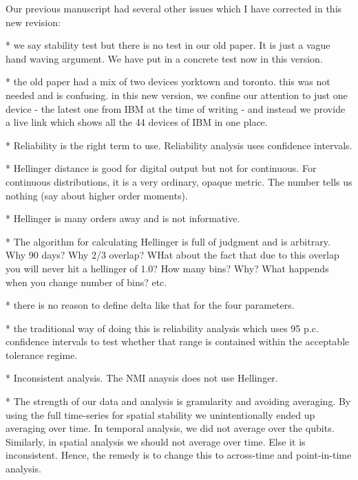 \documentclass[conference]{IEEEtran}
\begin{document}
Our previous manuscript had several other issues which I have corrected in this new revision:

* we say stability test but there is no test in our old paper. It is just a vague hand waving argument. We have put in a concrete test now in this version.

* the old paper had a mix of two devices yorktown and toronto. this was not needed and is confusing. in this new version, we confine our attention to just one device - the latest one from IBM at the time of writing - and instead we provide a live link which shows all the 44 devices of IBM in one place.

* Reliability is the right term to use. Reliability analysis uses confidence intervals.

* Hellinger distance is good for digital output but not for continuous. For continuous distributions, it is a very ordinary, opaque metric. The number tells us nothing (say about higher order moments).

* Hellinger is many orders away and is not informative.

* The algorithm for calculating Hellinger is full of judgment and is arbitrary. Why 90 days? Why 2/3 overlap? WHat about the fact that due to this overlap you will never hit a hellinger of 1.0? How many bins? Why? What happends when you change number of bins? etc.

* there is no reason to define delta like that for the four parameters.

* the traditional way of doing this is reliability analysis which uses 95 p.c. confidence intervals to test whether that range is contained within the acceptable tolerance regime.

* Inconsistent analysis. The NMI anaysis  does not use Hellinger.

* The strength of our data and analysis is granularity and avoiding averaging. By using the full time-series for spatial stability we unintentionally ended up averaging over time. In temporal analysis, we did not average over the qubits. Similarly, in spatial analysis we should not average over time. Else it is inconsistent. Hence, the remedy is to change this to across-time and point-in-time analysis.
\end{document}
